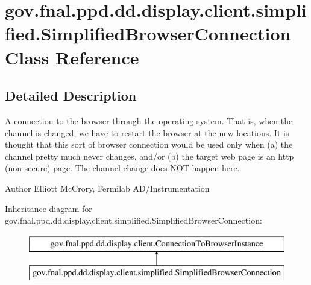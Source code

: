 \hypertarget{classgov_1_1fnal_1_1ppd_1_1dd_1_1display_1_1client_1_1simplified_1_1SimplifiedBrowserConnection}{\section{gov.\-fnal.\-ppd.\-dd.\-display.\-client.\-simplified.\-Simplified\-Browser\-Connection Class Reference}
\label{classgov_1_1fnal_1_1ppd_1_1dd_1_1display_1_1client_1_1simplified_1_1SimplifiedBrowserConnection}
}


\subsection{Detailed Description}
A connection to the browser through the operating system. That is, when the channel is changed, we have to restart the browser at the new locations. It is thought that this sort of browser connection would be used only when (a) the channel pretty much never changes, and/or (b) the target web page is an http (non-\/secure) page. The channel change does N\-O\-T happen here.

\begin{DoxyAuthor}{Author}
Elliott Mc\-Crory, Fermilab A\-D/\-Instrumentation 
\end{DoxyAuthor}
Inheritance diagram for gov.\-fnal.\-ppd.\-dd.\-display.\-client.\-simplified.\-Simplified\-Browser\-Connection\-:\begin{figure}[H]
\begin{center}
\leavevmode
\includegraphics[height=2.000000cm]{classgov_1_1fnal_1_1ppd_1_1dd_1_1display_1_1client_1_1simplified_1_1SimplifiedBrowserConnection}
\end{center}
\end{figure}
